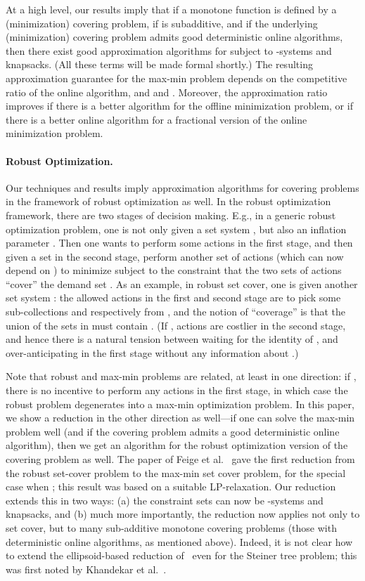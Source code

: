 \documentclass[11pt,letterpaper]{article}
\newcounter{note}[section]
\begin{document}
At a high level, our results imply that if a monotone function  is defined by a (minimization) covering problem, if
 is subadditive, and if the underlying (minimization) covering problem admits good deterministic online algorithms,
then there exist good approximation algorithms for \maxf subject to -systems and  knapsacks.  (All these terms
will be made formal shortly.) The resulting approximation guarantee for the max-min problem depends on the competitive
ratio of the online algorithm, and  and . Moreover, the approximation ratio improves if there is a better
algorithm for the offline minimization problem, or if there is a better online algorithm for a fractional version of
the online minimization problem.

\paragraph{Robust Optimization.}
Our techniques and results imply approximation algorithms for covering
problems in the framework of robust optimization as well. In the robust
optimization framework, there are two stages of decision making. E.g.,
in a generic robust optimization problem, one is not only given a set
system , but also an inflation parameter . Then
one wants to perform some actions in the first stage, and then given a
set  in the second stage, perform another set of actions
(which can now depend on ) to minimize
 subject to the constraint that
the two sets of actions ``cover'' the demand set . As an
example, in robust set cover, one is given another set system :
the allowed actions in the first and second stage are to pick some
sub-collections  and  respectively from , and the notion
of ``coverage'' is that the union of the sets in  must
contain . (If , actions are costlier in the second
stage, and hence there is a natural tension between waiting for the
identity of , and over-anticipating in the first stage without any
information about .)

Note that robust and max-min problems are related, at least in one direction: if , there is no incentive
to perform any actions in the first stage, in which case the robust problem degenerates into a max-min optimization
problem. In this paper, we show a reduction in the other direction as well---if one can solve the max-min problem well
(and if the covering problem admits a good deterministic online algorithm), then we get an algorithm for the robust
optimization version of the covering problem as well. The paper of Feige et al.~\cite{FJMM07} gave the first reduction
from the robust set-cover problem to the max-min set cover problem, for the special case when ; this
result was based on a suitable LP-relaxation. Our reduction extends this in two ways: (a) the constraint sets  can
now be -systems and  knapsacks, and (b) much more importantly, the reduction now applies not only to set cover,
but to many sub-additive monotone covering problems (those with deterministic online algorithms, as mentioned above).
Indeed, it is not clear how to extend the ellipsoid-based reduction of~\cite{FJMM07} even for the Steiner tree problem;
this was first noted by Khandekar et al.~\cite{KKMS08}.
\end{document}
